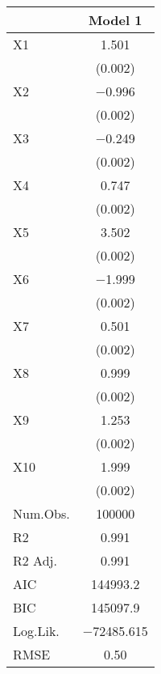 \documentclass{article}
\begin{document}
\begin{table}
\centering
\begin{tabular}[t]{lc}
\toprule
  & Model 1\\
\midrule
X1 & \num{1.501}\\
 & \vphantom{9} (\num{0.002})\\
X2 & \num{-0.996}\\
 & \vphantom{8} (\num{0.002})\\
X3 & \num{-0.249}\\
 & \vphantom{7} (\num{0.002})\\
X4 & \num{0.747}\\
 & \vphantom{6} (\num{0.002})\\
X5 & \num{3.502}\\
 & \vphantom{5} (\num{0.002})\\
X6 & \num{-1.999}\\
 & \vphantom{4} (\num{0.002})\\
X7 & \num{0.501}\\
 & \vphantom{3} (\num{0.002})\\
X8 & \num{0.999}\\
 & \vphantom{2} (\num{0.002})\\
X9 & \num{1.253}\\
 & \vphantom{1} (\num{0.002})\\
X10 & \num{1.999}\\
 & (\num{0.002})\\
\midrule
Num.Obs. & \num{100000}\\
R2 & \num{0.991}\\
R2 Adj. & \num{0.991}\\
AIC & \num{144993.2}\\
BIC & \num{145097.9}\\
Log.Lik. & \num{-72485.615}\\
RMSE & \num{0.50}\\
\bottomrule
\end{tabular}
\end{table}
\end{document}
